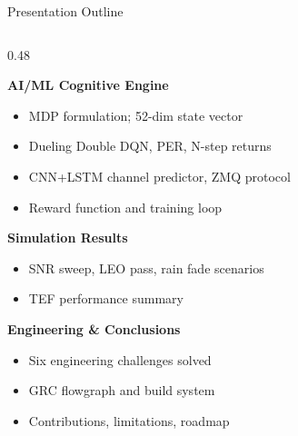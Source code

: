 \documentclass[aspectratio=169,10pt]{beamer}
\begin{document}
\begin{frame}{Presentation Outline}
\begin{columns}[T]
\begin{column}{0.48\textwidth}
\begin{itemize}
      \end{itemize}
      \vspace{0.3em}
      \textbf{\color{NUSblue}AI/ML Cognitive Engine}
      \begin{itemize}\scriptsize
        \item MDP formulation; 52-dim state vector
        \item Dueling Double DQN, PER, N-step returns
        \item CNN+LSTM channel predictor, ZMQ protocol
        \item Reward function and training loop
      \end{itemize}
      \vspace{0.3em}
      \textbf{\color{NUSblue}Simulation Results}
      \begin{itemize}\scriptsize
        \item SNR sweep, LEO pass, rain fade scenarios
        \item TEF performance summary
      \end{itemize}
      \vspace{0.3em}
      \textbf{\color{NUSblue}Engineering \& Conclusions}
      \begin{itemize}\scriptsize
        \item Six engineering challenges solved
        \item GRC flowgraph and build system
        \item Contributions, limitations, roadmap
      \end{itemize}
    \end{column}
  \end{columns}
\end{frame}
\end{document}
